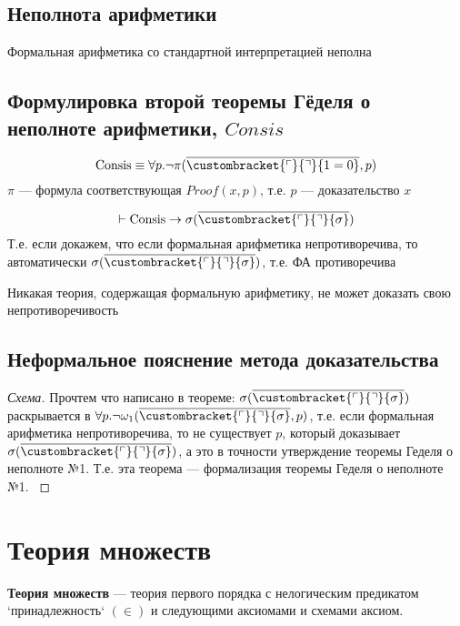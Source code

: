 \documentclass[english]{article}
\newcommand{\gedel}[1]{\custombracket{\ulcorner}{\urcorner}{#1}}
\begin{document}
\subsection{Неполнота арифметики}
\label{sec:orgf6736a9}
\begin{corollary}
	Формальная арифметика со стандартной интерпретацией неполна
	\label{org7e344ec}
\end{corollary}
\subsection{Формулировка второй теоремы Гёделя о неполноте арифметики, \(Consis\)}
\label{sec:org4f526f4}
\begin{definition}
	\[{\rm Consis} \equiv \forall p. \neg \pi(\overline{\gedel{1 = 0}}, p)\]
	\(\pi\) --- формула соответствующая \(Proof(x, p)\), т.е. \(p\) --- доказательство \(x\)
	\label{org64ceb50}
\end{definition}
\begin{theorem}
	\[ \vdash {\rm Consis} \to \sigma(\overline{\gedel{\sigma}}) \]
	Т.е. если докажем, что если формальная арифметика непротиворечива, то автоматически \(\sigma(\overline{\gedel{\sigma}})\), т.е. ФА противоречива
	\label{orgbc24845}
\end{theorem}
\begin{corollary}
	Никакая теория, содержащая формальную арифметику, не может доказать свою непротиворечивость
	\label{orgbf5aa8f}
\end{corollary}
\subsection{Неформальное пояснение метода доказательства}
\label{sec:org29fb7f9}
\begin{proof}[Схема]
	Прочтем что написано в теореме: \(\sigma(\overline{\gedel{\sigma}})\) раскрывается в \(\forall p. \neg \omega_1(\overline{\gedel{\sigma}}, p)\), т.е. если формальная арифметика непротиворечива, то не существует \(p\), который доказывает \(\sigma(\overline{\gedel{\sigma}})\), а это в точности утверждение теоремы Геделя о неполноте №1. Т.е. эта теорема --- формализация теоремы Геделя о неполноте №1.
	\label{orgc1ceb0f}
\end{proof}
\section{Теория множеств}
\label{sec:orgb55032d}
\begin{definition}
	\textbf{Теория множеств} --- теория первого порядка с нелогическим предикатом `принадлежность` \((\in)\) и следующими аксиомами и схемами аксиом.
	\label{orgec460c0}
\end{definition}
\end{document}
